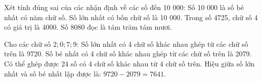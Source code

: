 \begin{ex} %
Xét tính đúng sai của các nhận định về các số đến 10 000:
\choiceTF
{\True Số 10 000 là số bé nhất có năm chữ số.}
{Số lớn nhất có bốn chữ số là 10 000.}
{\True Trong số 4725, chữ số 4 có giá trị là 4000.}
{Số 8080 đọc là tám trăm tám mươi.}
\end{ex}

\begin{ex} %
Cho các chữ số $2; 0; 7; 9$:
\choiceTF
{\True Số lớn nhất có 4 chữ số khác nhau ghép từ các chữ số trên là 9720.}
{\True Số bé nhất có 4 chữ số khác nhau ghép từ các chữ số trên là 2079.}
{Có thể ghép được 24 số có 4 chữ số khác nhau từ 4 chữ số trên.}
{\True Hiệu giữa số lớn nhất và số bé nhất lập được là: $9720 - 2079 = 7641$.}
\end{ex}

